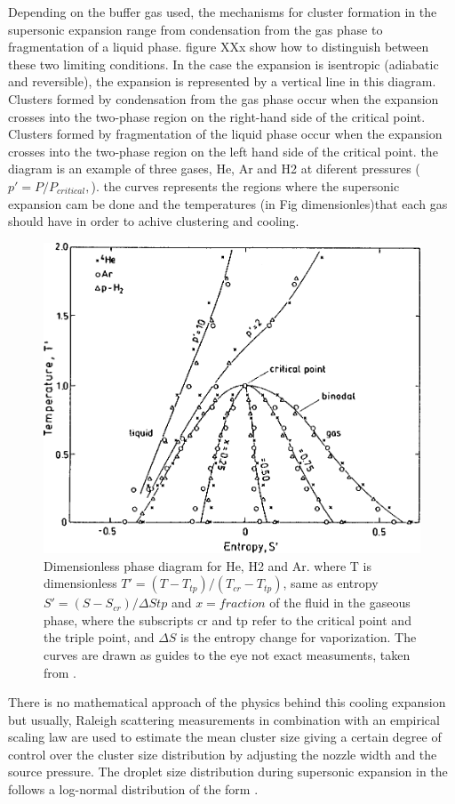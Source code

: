 Depending on the buffer gas used, the mechanisms for cluster formation in the supersonic expansion range from condensation from the gas phase to fragmentation of a liquid phase. figure XXx show how to distinguish between these two limiting conditions. In the case the expansion is isentropic (adiabatic and reversible), the expansion is represented by a vertical line in this diagram. Clusters formed by condensation from the gas phase occur when the expansion crosses into the two-phase region on the right-hand side of the critical point. Clusters formed by fragmentation of the liquid phase occur when the expansion crosses into the two-phase region on the left hand side of the critical point. the diagram is an example of three gases, He, Ar and H2 at diferent pressures ($p'=P/P_{critical},$)\cite{knuth_average_1999}. the curves represents the regions where the supersonic expansion cam be done and the temperatures (in Fig dimensionles)that each gas should have in order to achive clustering and cooling.\cite{knuth_average_1999}

\begin{figure}[hbtp]
 \centering
 \label{img:t-s_He}
 \includegraphics[width= 8 cm]{../Images/dimensiones isentropic diagram.png}
 \caption{Dimensionless phase diagram for He, H2 and Ar. where T is
dimensionless $T'=(T -T_{tp})/(T_{cr}-T_{tp})$, same as entropy $S'=(S-S_{cr})/\Delta Stp$ and $x=fraction$ of
the fluid in the gaseous phase, where the subscripts cr and tp refer to the
critical point and the triple point, and $\Delta S$ is the entropy change for vaporization. The curves are
drawn as guides to the eye not exact measuments, taken from \cite{knuth_average_1999}.}
 \end{figure}
  

There is no mathematical approach of the physics behind this cooling expansion but usually, Raleigh scattering measurements in combination with an empirical scaling law \cite{hagena_cluster_1972} are used to estimate the mean cluster size giving a certain degree of control over the cluster size distribution by adjusting the nozzle width and the source pressure. The droplet size distribution during supersonic expansion in the follows a log-normal distribution of the form \cite{harms_density_1998}.

